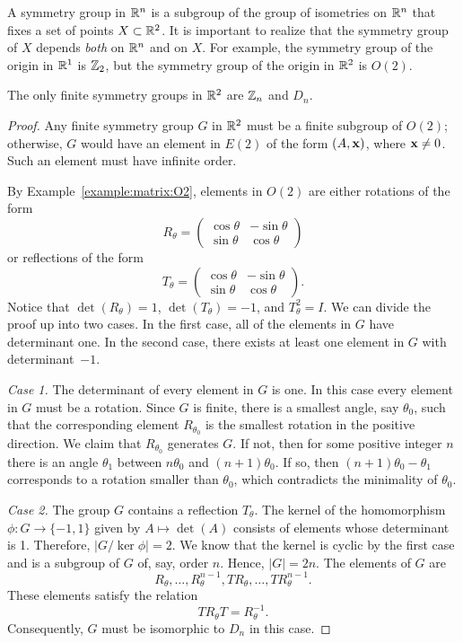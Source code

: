  
A {\bfi symmetry group\/} in ${\Bbb R}^n$ is a
subgroup of the group of isometries on ${\Bbb R}^n$ that fixes a set
of points $X \subset {\Bbb R}^2$.  It is important to realize that the
symmetry group of $X$ depends {\em both\/} on ${\Bbb R}^n$ and on
$X$. For example, the symmetry group of the origin in ${\Bbb R}^1$ is
${\Bbb Z}_2$, but the symmetry group of the origin in ${\Bbb R}^2$ is
$O(2)$. 
 
 
\begin{theorem}
The only finite symmetry groups in ${\Bbb R}^2$ are ${\Bbb Z}_n$ and
$D_n$. 
\end{theorem}
 
 
\begin{proof}
Any finite symmetry group $G$ in ${\Bbb R}^2$ must be a finite
subgroup of $O(2)$; otherwise, $G$ would have an element in $E(2)$ of
the form $(A, {\bold x})$, where ${\bold x} \neq 0$.  Such an element
must have infinite order. 
 
 
By Example~\ref{example:matrix:O2}, elements in $O(2)$ are either rotations of the form
\[
R_{\theta}
=
\begin{pmatrix}
\cos \theta & - \sin \theta \\
\sin \theta & \cos \theta
\end{pmatrix}
\]
or reflections of the form
\[T_{\theta}
=
\begin{pmatrix}
\cos \theta & - \sin \theta \\
\sin \theta & \cos \theta
\end{pmatrix}.
\]
Notice that $\det(R_{\theta})=1$,  $\det(T_{\theta})=-1$,
and $T_{\theta}^2=I$. We can divide the proof up into two cases.  In
the first case, all of the elements in $G$ have determinant one. In the
second case, there exists at least one element in $G$ with 
determinant~$-1$.  
 
 
{\em Case 1.}  
The determinant of every element in $G$ is one. In this case every
element in $G$ must be a rotation. Since $G$ is finite, there is a
smallest angle, say $\theta_0$, such that the corresponding element
$R_{\theta_0}$ is the smallest rotation in the positive direction.  We
claim that $R_{\theta_0}$ generates $G$.  If not, then for some
positive integer $n$ there is an angle $\theta_1$ between $n \theta_0$
and $(n+1) \theta_0$. If so, then $(n+1) \theta_0 - \theta_1$
corresponds to a rotation smaller than $\theta_0$, which contradicts
the minimality of $\theta_0$.   
 
 
 
{\em Case 2.}  
The group $G$ contains a reflection $T_{\theta}$.  The kernel of the
homomorphism $\phi : G \rightarrow \{-1, 1\}$ given by $A \mapsto
\det(A)$ consists of elements whose determinant is 1.  Therefore, $|G/
\ker \phi|=2$.  We know that the kernel is cyclic by the first case
and is a subgroup of $G$ of, say, order $n$. Hence, $|G| = 2n$. The
elements of $G$ are
\[
R_{\theta}, \ldots, R_{\theta}^{n-1},  TR_{\theta}, \ldots,
TR_{\theta}^{n-1}.
\]
These elements satisfy the relation
\[
TR_{\theta}T = R_{\theta}^{-1}.
\]
Consequently, $G$ must be isomorphic to $D_n$ in this case.
\end{proof}
 
